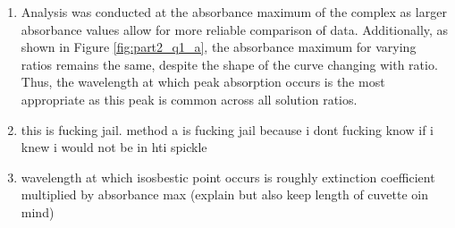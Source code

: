 \begin{enumerate}
    \item Analysis was conducted at the absorbance maximum of the \ce{[FUCK]} complex as larger absorbance values allow for more reliable comparison of data. Additionally, as shown in Figure \ref{fig:part2_q1_a}, the absorbance maximum for varying ratios remains the same, despite the shape of the curve changing with ratio. Thus, the wavelength at which peak absorption occurs is the most appropriate as this peak is common across all solution ratios.
    \item this is fucking jail. method a is fucking jail because i dont fucking know if i knew i would not be in hti spickle
    \item wavelength at which isosbestic point occurs is roughly extinction coefficient multiplied by absorbance max (explain but also keep length of cuvette oin mind)
\end{enumerate}


